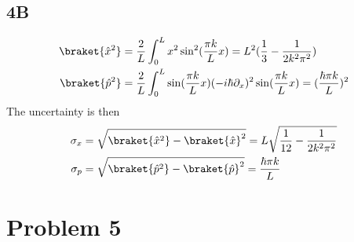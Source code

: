 \subsection*{4B}
\begin{equation}
    \begin{split}
        \braket{\hat{x}^2} &= \frac{2}{L}\int_0^Lx^2\sin^2(\frac{\pi k}{L}x)=L^2(\frac{1}{3}-\frac{1}{2k^2\pi^2})\\
        \braket{\hat{p}^2} &= \frac{2}{L}\int_0^L\sin(\frac{\pi k}{L}x)(-i\hbar\partial_x)^2\sin(\frac{\pi k}{L}x) = (\frac{\hbar \pi k}{L})^2
    \end{split}
\end{equation}
The uncertainty is then
\begin{equation}
    \begin{split}
        \sigma_x&=\sqrt{\braket{\hat{x}^2}-\braket{\hat{x}}^2}=L\sqrt{\frac{1}{12}-\frac{1}{2k^2\pi^2}}\\
        \sigma_p &= \sqrt{\braket{\hat{p}^2}-\braket{\hat{p}}^2} = \frac{\hbar \pi k}{L}
    \end{split}
\end{equation}

\section*{Problem 5}

